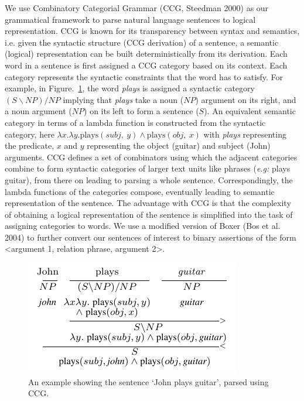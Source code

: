 \documentclass{llncs}
\begin{document}
We use Combinatory Categorial Grammar (CCG, Steedman 2000) as our grammatical framework to parse natural language sentences to logical representation. CCG is known for its transparency between syntax and semantics, i.e. given the syntactic structure (CCG derivation) of a sentence, a semantic (logical) representation can be built deterministically from its derivation. Each word in a sentence is first assigned a CCG category based on its context. Each category represents the syntactic constraints that the word has to satisfy. For example, in Figure.~\ref{fig:ccg_sample}, the word \textit{plays} is assigned a syntactic category $(S\backslash NP)/NP$ implying that \textit{plays} take a noun ($NP$) argument on its right, and a noun argument ($NP$) on its left to form a sentence ($S$). An equivalent semantic category in terms of a lambda function is constructed from the syntactic category, here $\lambda x. \lambda y. \mathrm{plays}(subj,~y) \wedge \mathrm{plays}(obj,~x)$ with \textit{plays} representing the predicate, $x$ and $y$ representing the object (guitar) and subject (John) arguments. CCG defines a set of combinators using which the adjacent categories combine to form syntactic categories of larger text units like phrases (\textit{e.g:} plays guitar), from there on leading to parsing a whole sentence. Correspondingly, the lambda functions of the categories compose, eventually leading to semantic representation of the sentence. The advantage with CCG is that the complexity of obtaining a logical representation of the sentence is simplified into the task of assigning categories to words. We use a modified version of Boxer (Bos et al. 2004) to further convert our sentences of interest to binary assertions of the form <argument 1, relation phrase, argument 2>.
\begin{figure}[!t]
\centering
\includegraphics[width=0.6\linewidth]{figures/ccg_sample.pdf}
\caption{An example showing the sentence `John plays guitar', parsed using CCG.}
\label{fig:ccg_sample}
\end{figure}
\end{document}
